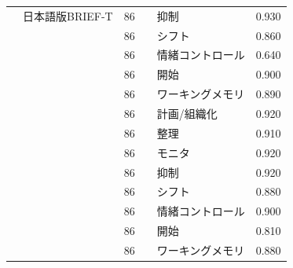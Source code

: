 \begin{landscape}
\begin{longtable}{p{2cm}p{2cm}p{2cm}p{6cm}p{2cm}p{2cm}}
		\textcite{Nagatani202292}   & 日本語版BRIEF-T                      & 86  &                                                     & 抑制                   & 0.930      \\
		                         &                                  & 86  &                                                     & シフト                  & 0.860      \\
		                         &                                  & 86  &                                                     & 情緒コントロール             & 0.640      \\
		                         &                                  & 86  &                                                     & 開始                   & 0.900      \\
		                         &                                  & 86  &                                                     & ワーキングメモリ             & 0.890      \\
		                         &                                  & 86  &                                                     & 計画/組織化               & 0.920      \\
		                         &                                  & 86  &                                                     & 整理                   & 0.910      \\
		                         &                                  & 86  &                                                     & モニタ                  & 0.920      \\
		                         &                                  & 86  &                                                     & 抑制                   & 0.920      \\
		                         &                                  & 86  &                                                     & シフト                  & 0.880      \\
		                         &                                  & 86  &                                                     & 情緒コントロール             & 0.900      \\
		                         &                                  & 86  &                                                     & 開始                   & 0.810      \\
		                         &                                  & 86  &                                                     & ワーキングメモリ             & 0.880      \\

\end{longtable}
\end{landscape}
